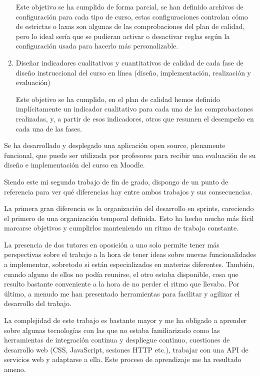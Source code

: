 \begin{enumerate}
		Este objetivo se ha cumplido de forma parcial, se han definido archivos de configuración para cada tipo de curso, estas configuraciones controlan cómo de estrictas o laxas son algunas de las comprobaciones del plan de calidad, pero lo ideal sería que se pudieran activar o desactivar reglas según la configuración usada para hacerlo más personalizable.
		
		\item Diseñar indicadores cualitativos y cuantitativos de calidad de cada fase de diseño instruccional del curso en línea (diseño, implementación, realización y evaluación) 
		
		Este objetivo se ha cumplido, en el plan de calidad hemos definido implícitamente un indicador cualitativo para cada una de las comprobaciones realizadas, y, a partir de esos indicadores, otros que resumen el desempeño en cada una de las fases.
	\end{enumerate}
	
	Se ha desarrollado y desplegado una aplicación open source, plenamente funcional, que puede ser utilizada por profesores para recibir una evaluación de su diseño e implementación del curso en Moodle.

	Siendo este mi segundo trabajo de fin de grado, dispongo de un punto de referencia para ver qué diferencias hay entre ambos trabajos y sus consecuencias.
	
	La primera gran diferencia es la organización del desarrollo en sprints, careciendo el primero de una organización temporal definida. Esto ha hecho mucho más fácil marcarse objetivos y cumplirlos manteniendo un ritmo de trabajo constante.
	
	La presencia de dos tutores en oposición a uno solo permite tener más perspectivas sobre el trabajo a la hora de tener ideas sobre nuevas funcionalidades a implementar, sobretodo si están especializados en materias diferentes. También, cuando alguno de ellos no podía reunirse, el otro estaba disponible, cosa que resulto bastante conveniente a la hora de no perder el ritmo que llevaba. Por último, a menudo me han presentado herramientas para facilitar y agilizar el desarrollo del trabajo.
	
	La complejidad de este trabajo es bastante mayor y me ha obligado a aprender sobre algunas tecnologías con las que no estaba familiarizado como las herramientas de integración continua y despliegue continuo, cuestiones de desarrollo web (CSS, JavaScript, sesiones HTTP etc.), trabajar con una API de servicios web y adaptarse a ella. Este proceso de aprendizaje me ha resultado ameno.

